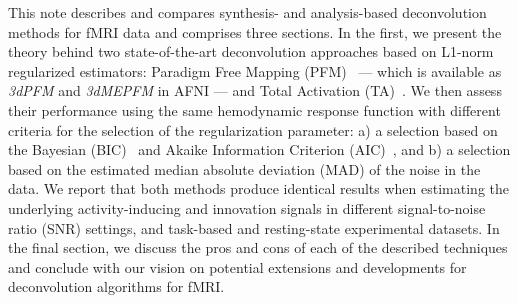This note describes and compares synthesis- and analysis-based deconvolution methods for fMRI data and comprises three sections. In the first, we present the theory behind two state-of-the-art deconvolution approaches based on L1-norm regularized estimators: Paradigm Free Mapping (PFM)~\cite{caballerogaudes2013ParadigmFreeMapping} --- which is available as \textit{3dPFM} and \textit{3dMEPFM} in AFNI --- and Total Activation (TA)~\cite{karahanoglu2013TotalActivationFMRI}. We then assess their performance using the same hemodynamic response function with different criteria for the selection of the regularization parameter: a) a selection based on the Bayesian (BIC)~\cite{schwarz1978EstimatingDimensionModel} and Akaike Information Criterion (AIC)~\cite{akaike1998InformationTheoryExtension}, and b) a selection based on the estimated median absolute deviation (MAD) of the noise in the data. We report that both methods produce identical results when estimating the underlying activity-inducing and innovation signals in different signal-to-noise ratio (SNR) settings, and task-based and resting-state experimental datasets. In the final section, we discuss the pros and cons of each of the described techniques and conclude with our vision on potential extensions and developments for deconvolution algorithms for fMRI.